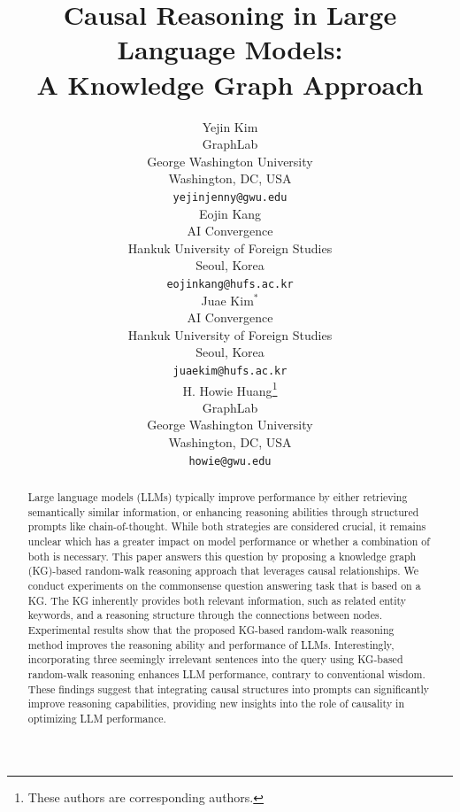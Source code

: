 \documentclass{article}
\title{Causal Reasoning in Large Language Models: \\
A Knowledge Graph Approach}
\author{%
  Yejin Kim \\
  GraphLab \\
  George Washington University\\
  Washington, DC, USA \\
  \texttt{yejinjenny@gwu.edu} \\
  \And
  Eojin Kang \\
  AI Convergence \\
  Hankuk University of Foreign Studies \\
  Seoul, Korea \\
  \texttt{eojinkang@hufs.ac.kr} \\
  \And
  Juae Kim$^{*}$ \\
  AI Convergence \\
  Hankuk University of Foreign Studies \\
  Seoul, Korea \\
  \texttt{juaekim@hufs.ac.kr} \\
  \And
  H. Howie Huang\thanks{These authors are corresponding authors.} \\
  GraphLab \\
  George Washington University \\
  Washington, DC, USA \\
  \texttt{howie@gwu.edu} \\
}
\begin{document}
\maketitle


\begin{abstract}
Large language models (LLMs) typically improve performance by either retrieving semantically similar information, or enhancing reasoning abilities through structured prompts like chain-of-thought. While both strategies are considered crucial, it remains unclear which has a greater impact on model performance or whether a combination of both is necessary. This paper answers this question by proposing a knowledge graph (KG)-based random-walk reasoning approach that leverages causal relationships. We conduct experiments on the commonsense question answering task that is based on a KG. The KG inherently provides both relevant information, such as related entity keywords, and a reasoning structure through the connections between nodes. Experimental results show that the proposed KG-based random-walk reasoning method improves the reasoning ability and performance of LLMs. Interestingly, incorporating three seemingly irrelevant sentences into the query using KG-based random-walk reasoning enhances LLM performance, contrary to conventional wisdom. These findings suggest that integrating causal structures into prompts can significantly improve reasoning capabilities, providing new insights into the role of causality in optimizing LLM performance.




\end{abstract}
\end{document}
